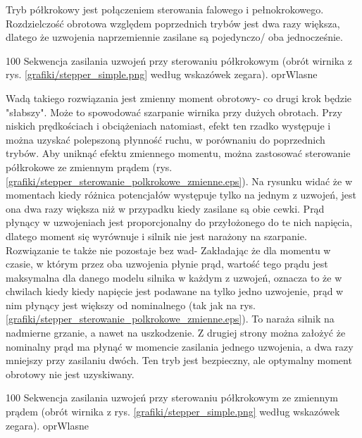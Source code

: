 
Tryb półkrokowy jest połączeniem sterowania falowego i pełnokrokowego. Rozdzielczość obrotowa względem poprzednich trybów jest dwa razy większa, dlatego że uzwojenia naprzemiennie zasilane są pojedynczo/ oba jednocześnie.

		{100}
		{Sekwencja zasilania uzwojeń przy sterowaniu półkrokowym (obrót wirnika z rys. \ref{grafiki/stepper_simple.png} według wskazówek zegara).}
		{oprWlasne}
		
Wadą takiego rozwiązania jest zmienny moment obrotowy- co drugi krok będzie "słabszy". Może to spowodować szarpanie wirnika przy dużych obrotach. Przy niskich prędkościach i obciążeniach natomiast, efekt ten rzadko występuje i można uzyskać polepszoną płynność ruchu, w porównaniu do poprzednich trybów. Aby uniknąć efektu zmiennego momentu, można zastosować sterowanie półkrokowe ze zmiennym prądem (rys. \ref{grafiki/stepper_sterowanie_polkrokowe_zmienne.eps}). Na rysunku widać że w momentach kiedy różnica potencjałów występuje tylko na jednym z uzwojeń, jest ona dwa razy większa niż w przypadku kiedy zasilane są obie cewki. Prąd płynący w uzwojeniach jest proporcjonalny do przyłożonego do te nich napięcia, dlatego moment się wyrównuje i silnik nie jest narażony na szarpanie. Rozwiązanie te także nie pozostaje bez wad- Zakładając że dla momentu w czasie, w którym przez oba uzwojenia płynie prąd, wartość tego prądu jest maksymalna dla danego modelu silnika w każdym z uzwojeń, oznacza to że w chwilach kiedy kiedy napięcie jest podawane na tylko jedno uzwojenie, prąd w nim płynący jest większy od nominalnego (tak jak na rys. \ref{grafiki/stepper_sterowanie_polkrokowe_zmienne.eps}). To naraża silnik na nadmierne grzanie, a nawet na uszkodzenie. Z drugiej strony można założyć że nominalny prąd ma płynąć w momencie zasilania jednego uzwojenia, a dwa razy mniejszy przy zasilaniu dwóch. Ten tryb jest bezpieczny, ale optymalny moment obrotowy nie jest uzyskiwany.

		{100}
		{Sekwencja zasilania uzwojeń przy sterowaniu półkrokowym ze zmiennym prądem (obrót wirnika z rys. \ref{grafiki/stepper_simple.png} według wskazówek zegara).}
		{oprWlasne}

\clearpage

